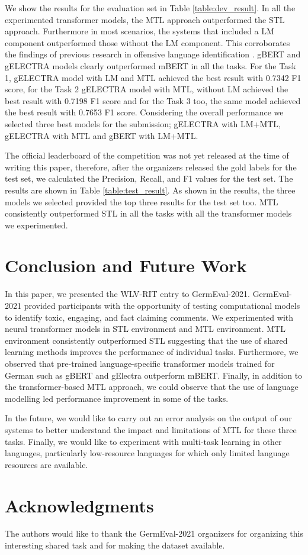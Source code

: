 \documentclass[11pt,a4paper]{article}
\begin{document}
We show the results for the evaluation set in Table \ref{table:dev_result}. In all the experimented transformer models, the MTL approach outperformed the STL approach. Furthermore in most scenarios, the systems that included a LM component outperformed those without the LM component. This corroborates the findings of previous research in offensive language identification \cite{ranasinghe2019brums}. gBERT and gELECTRA models clearly outperformed mBERT in all the tasks. For the Task 1, gELECTRA model with LM and MTL achieved the best result with 0.7342 F1 score, for the Task 2 gELECTRA model with MTL, without LM achieved the best result with 0.7198 F1 score and for the Task 3 too, the same model achieved the best result with 0.7653 F1 score. Considering the overall performance we selected three best models for the submission; gELECTRA with LM+MTL, gELECTRA with MTL and gBERT with LM+MTL. 

The official leaderboard of the competition was not yet released at the time of writing this paper, therefore, after the organizers released the gold labels for the test set, we calculated the Precision, Recall, and F1 values for the test set. The results are shown in Table \ref{table:test_result}. As shown in the results, the three models we selected provided the top three results for the test set too. MTL consistently outperformed STL in all the tasks with all the transformer models we experimented.


\section{Conclusion and Future Work}
\label{sec:conclusion}
In this paper, we presented the WLV-RIT entry to GermEval-2021. GermEval-2021 provided participants with the opportunity of testing computational models to identify toxic, engaging, and fact claiming comments. We experimented with neural transformer models in STL environment and MTL environment. MTL environment consistently outperformed STL suggesting that the use of shared learning methods improves the performance of individual tasks. Furthermore, we observed that pre-trained language-specific transformer models trained for German such as gBERT and gElectra outperform mBERT. Finally, in addition to the transformer-based MTL approach, we could observe that the use of language modelling led performance improvement in some of the tasks.  

In the future, we would like to carry out an error analysis on the output of our systems to better understand the impact and limitations of MTL for these three tasks. Finally, we would like to experiment with multi-task learning in other languages, particularly low-resource languages for which only limited language resources are available.

\section*{Acknowledgments}

The authors would like to thank the GermEval-2021 organizers for organizing this interesting shared task and for making the dataset available. 



\end{document}
